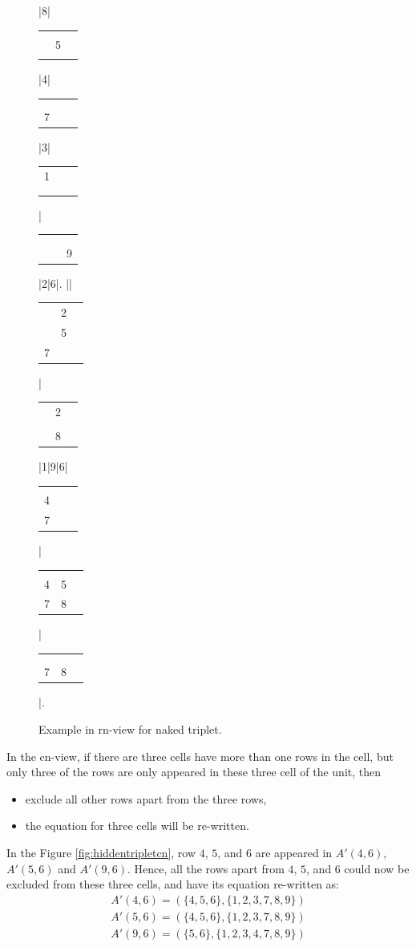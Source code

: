 \documentclass[11pt]{report}
\newcommand{\cell}[9]{%
\scriptsize
\setlength{\tabcolsep}{1pt}
\renewcommand{\arraystretch}{0.5}
\hspace{-0.6em}
\begin{tabular}{ccc}
#1 & #2 & #3\\
#4 & #5 & #6\\
#7 & #8 & #9
\end{tabular}
}
\newcommand{\set}[1]{\{ #1 \}}
\begin{document}
\begin{figure}[htbp]
\begin{sudoku}
|{8}|{\cell {}{}{}{}5{}{}{}{}}|4| {\cell {}{}{}{}{}{}7{}{}}|3| {\cell 1{}{}{}{}{}{}{}{}}|{\cell {}{}{}{}{}{}{}{}9}|2|6|.
|{\makebox[0pt]{\hspace{-2.3em}\large r9}{\cell {}{}3{}{}{}{}{}{}}}| {\cell {}2{}{}5{}7{}{}}|{\cell {}2{}{}{}{}{}8{}}|1|9|6|{\cell {}{}{}4{}{}7{}{}}| {\cell {}{}{}45{}78{}}|{\cell {}{}{}{}{}{}78{}}|.
\end{sudoku}
\caption{Example in rn-view for naked triplet.}
\label{fig:nakedtripletrn}
\end{figure}

In the cn-view, if there are three cells have more than one rows in the cell, but only three of the rows are only appeared in these three cell of the unit, then
\begin{itemize}
\item exclude all other rows apart from the three rows,
\item the equation for three cells will be re-written.
\end{itemize}

In the Figure \ref{fig:hiddentripletcn}, row $4$, $5$, and $6$ are appeared in $A'(4,6)$, $A'(5,6)$ and $A'(9,6)$. Hence, all the rows apart from $4$, $5$, and $6$ could now be excluded from these three cells, and have its equation re-written as:
\begin{eqnarray*}
A'(4,6) = (\set{4, 5, 6}, \set{1, 2, 3, 7, 8, 9})\\
A'(5,6) = (\set{4, 5, 6}, \set{1, 2, 3, 7, 8, 9})\\
A'(9,6) = (\set{5, 6}, \set{1, 2, 3, 4, 7, 8, 9})\\
\end{eqnarray*}
\end{document}
